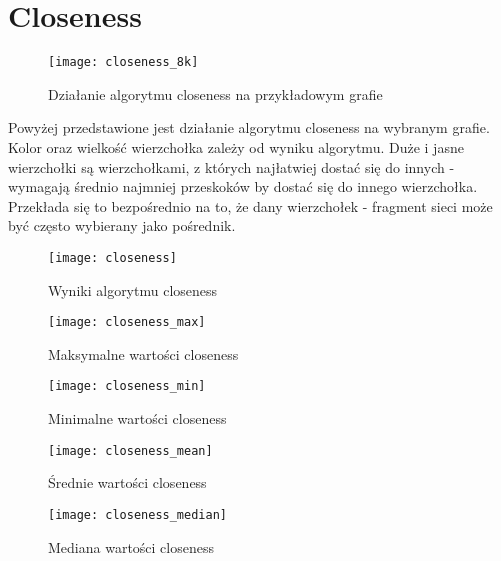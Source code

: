 \section{Closeness}
\FloatBarrier
\begin{figure}[h]
	\centering
	\texttt{[image: closeness\_8k]}
	\caption{Działanie algorytmu closeness na przykładowym grafie}
\end{figure}
\FloatBarrier
Powyżej przedstawione jest działanie algorytmu closeness na wybranym grafie. Kolor oraz wielkość wierzchołka zależy od wyniku algorytmu. Duże i jasne wierzchołki są wierzchołkami, z których najłatwiej dostać się do innych - wymagają średnio najmniej przeskoków by dostać się do innego wierzchołka. Przekłada się to bezpośrednio na to, że dany wierzchołek - fragment sieci może być często wybierany jako pośrednik.
\FloatBarrier
\begin{figure}[h]
	\centering
	\texttt{[image: closeness]}
	\caption{Wyniki algorytmu closeness}
\end{figure}
\FloatBarrier\FloatBarrier
\begin{figure}[h]
	\centering
	\texttt{[image: closeness\_max]}
	\caption{Maksymalne wartości closeness}
\end{figure}
\FloatBarrier\FloatBarrier
\begin{figure}[h]
	\centering
	\texttt{[image: closeness\_min]}
	\caption{Minimalne wartości closeness}
\end{figure}
\FloatBarrier\FloatBarrier
\begin{figure}[h]
	\centering
	\texttt{[image: closeness\_mean]}
	\caption{Średnie wartości closeness}
\end{figure}
\FloatBarrier\FloatBarrier
\begin{figure}[h]
	\centering
	\texttt{[image: closeness\_median]}
	\caption{Mediana wartości closeness}
\end{figure}
\FloatBarrier
\newpage